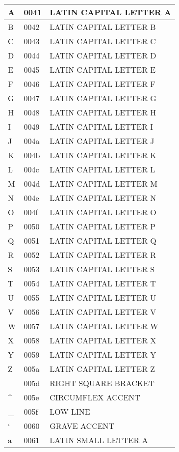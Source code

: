 \documentclass[12pt,letterpaper,openany]{book}
\begin{document}
\begin{center}
\begin{supertabular}{|m{0.25in}|m{0.5in}|m{4in}|}
A & 0041 & LATIN CAPITAL LETTER A\\\hline
B & 0042 & LATIN CAPITAL LETTER B\\\hline
C & 0043 & LATIN CAPITAL LETTER C\\\hline
D & 0044 & LATIN CAPITAL LETTER D\\\hline
E & 0045 & LATIN CAPITAL LETTER E\\\hline
F & 0046 & LATIN CAPITAL LETTER F\\\hline
G & 0047 & LATIN CAPITAL LETTER G\\\hline
H & 0048 & LATIN CAPITAL LETTER H\\\hline
I & 0049 & LATIN CAPITAL LETTER I\\\hline
J & 004a & LATIN CAPITAL LETTER J\\\hline
K & 004b & LATIN CAPITAL LETTER K\\\hline
L & 004c & LATIN CAPITAL LETTER L\\\hline
M & 004d & LATIN CAPITAL LETTER M\\\hline
N & 004e & LATIN CAPITAL LETTER N\\\hline
O & 004f & LATIN CAPITAL LETTER O\\\hline
P & 0050 & LATIN CAPITAL LETTER P\\\hline
Q & 0051 & LATIN CAPITAL LETTER Q\\\hline
R & 0052 & LATIN CAPITAL LETTER R\\\hline
S & 0053 & LATIN CAPITAL LETTER S\\\hline
T & 0054 & LATIN CAPITAL LETTER T\\\hline
U & 0055 & LATIN CAPITAL LETTER U\\\hline
V & 0056 & LATIN CAPITAL LETTER V\\\hline
W & 0057 & LATIN CAPITAL LETTER W\\\hline
X & 0058 & LATIN CAPITAL LETTER X\\\hline
Y & 0059 & LATIN CAPITAL LETTER Y\\\hline
Z & 005a & LATIN CAPITAL LETTER Z\\ & 005d & RIGHT SQUARE BRACKET\\\hline
\^ & 005e & CIRCUMFLEX ACCENT\\\hline
\_ & 005f & LOW LINE\\\hline
` & 0060 & GRAVE ACCENT\\\hline
a & 0061 & LATIN SMALL LETTER A\\\hline

\end{supertabular}
\end{center}
\end{document}
